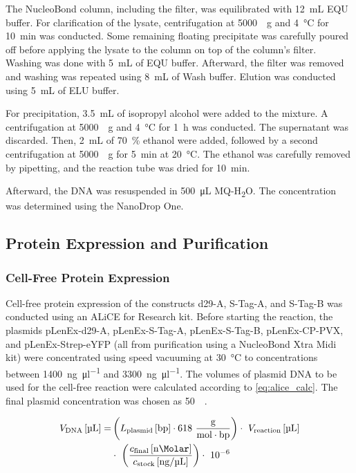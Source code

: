 The NucleoBond column, including the filter, was equilibrated with \SI{12}{\milli\liter} EQU buffer. For clarification of the lysate, centrifugation at \SI{5000}{\times g} and \SI{4}{\celsius} for \SI{10}{\minute} was conducted. Some remaining floating precipitate was carefully poured off before applying the lysate to the column on top of the column's filter. Washing was done with \SI{5}{\milli\liter} of EQU buffer. Afterward, the filter was removed and washing was repeated using \SI{8}{\milli\liter} of Wash buffer. Elution was conducted using \SI{5}{\milli\liter} of ELU buffer.

For precipitation, \SI{3.5}{\milli\liter} of isopropyl alcohol were added to the mixture. A centrifugation at \SI{5000}{\times g} and \SI{4}{\celsius} for \SI{1}{\hour} was conducted. The supernatant was discarded. Then, \SI{2}{\milli\liter} of \SI{70}{\percent} ethanol were added, followed by a second centrifugation at \SI{5000}{\times g} for \SI{5}{\minute} at \SI{20}{\celsius}. The ethanol was carefully removed by pipetting, and the reaction tube was dried for \SI{10}{\minute}. 

Afterward, the DNA was resuspended in \SI{500}{\micro\liter} MQ-H\textsubscript{2}O. The concentration was determined using the NanoDrop\textsuperscript{\texttrademark} One.

\subsection{Protein Expression and Purification}
\subsubsection{Cell-Free Protein Expression}
Cell-free protein expression of the constructs d29-A, S-Tag-A, and S-Tag-B was conducted using an ALiCE\textsuperscript{\textregistered} for Research kit. Before starting the reaction, the plasmids pLenEx-d29-A, pLenEx-S-Tag-A, pLenEx-S-Tag-B, pLenEx-CP-PVX, and pLenEx-Strep-eYFP (all from purification using a NucleoBond Xtra Midi kit) were concentrated using speed vacuuming at \SI{30}{\degreeCelsius} to concentrations between \SI{1400}{\nano\gram\per\micro\litre} and \SI{3300}{\nano\gram\per\micro\litre}. The volumes of plasmid DNA to be used for the cell-free reaction were calculated according to \autoref{eq:alice_calc}. The final plasmid concentration was chosen as \SI{50}{\nano\Molar}. 

\begin{align}
    \label{eq:alice_calc}
    \begin{split}
V_{\text{DNA}}\, [\si{\micro\liter}] =&\left( L_{\text{plasmid}}\, [\text{bp}] \cdot 618\ \frac{\text{g}}{\text{mol} \cdot \text{bp}} \right) \cdot\ V_{\text{reaction}}\, [\si{\micro\liter}] \\
& \cdot\ \left( \frac{c_{\text{final}}\, [\si{\nano\Molar}]}{c_{\text{stock}}\, [\si{\nano\gram}/\si{\micro\liter}]} \right) \cdot\ 10^{-6}
    \end{split}
\end{align}

